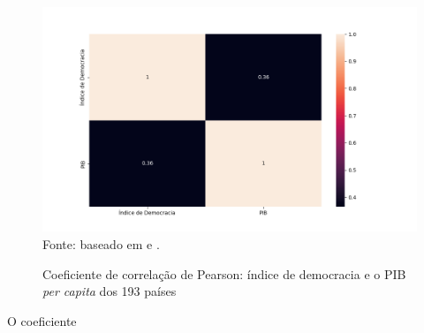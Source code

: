 \begin{figure}[H]
    \centering
    \caption{Coeficiente de correlação de Pearson: índice de democracia e o PIB \textit{per capita} dos 193 países}
    \includegraphics[width=1\linewidth]{figuras/egdi/correlacao4.png}
    \label{fig:correlacao4}
    \footnotesize{Fonte: baseado em \cite{ONU_edgi_mapa} e \cite{electoral_democracy_index}.}
\end{figure}

O coeficiente


